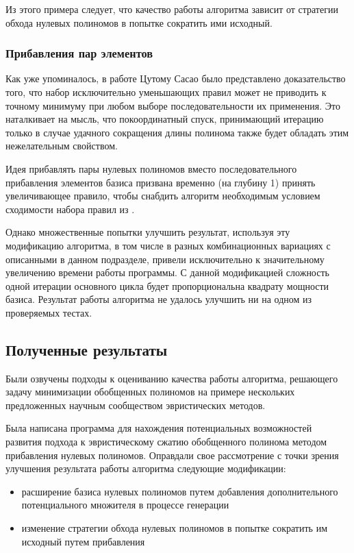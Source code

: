 \documentclass[a4paper,12pt,titlepage,finall]{article}
\begin{document}
Из этого примера следует, что качество работы алгоритма зависит от стратегии обхода нулевых полиномов в попытке сократить ими исходный.

\subsubsection{Прибавления пар элементов}

Как уже упоминалось, в работе Цутому Сасао \cite{convergence} было представлено доказательство того, что набор исключительно уменьшающих правил может не приводить к точному минимуму при любом выборе последовательности их применения. Это наталкивает на мысль, что покоординатный спуск, принимающий итерацию только в случае удачного сокращения длины полинома также будет обладать этим нежелательным свойством.

Идея прибавлять пары нулевых полиномов вместо последовательного прибавления элементов базиса призвана временно (на глубину 1) принять увеличивающее правило, чтобы снабдить алгоритм необходимым условием сходимости набора правил из \cite{convergence}.

Однако множественные попытки улучшить результат, используя эту модификацию алгоритма, в том числе в разных комбинационных вариациях с описанными в данном подразделе, привели исключительно к значительному увеличению времени работы программы. С данной модификацией сложность одной итерации основного цикла будет пропорциональна квадрату мощности базиса. Результат работы алгоритма не удалось улучшить ни на одном из проверяемых тестах.

\subsection{Полученные результаты}

Были озвучены подходы к оцениванию качества работы алгоритма, решающего задачу минимизации обобщенных полиномов на примере нескольких предложенных научным сообществом эвристических методов.

Была написана программа для нахождения потенциальных возможностей развития подхода к эвристическому сжатию обобщенного полинома методом прибавления нулевых полиномов. Оправдали свое рассмотрение с точки зрения улучшения результата работы алгоритма следующие модификации:
\begin{itemize}
    \item расширение базиса нулевых полиномов путем добавления дополнительного потенциального множителя в процессе генерации
    \item изменение стратегии обхода нулевых полиномов в попытке сократить им исходный путем прибавления
\end{itemize}
\end{document}
